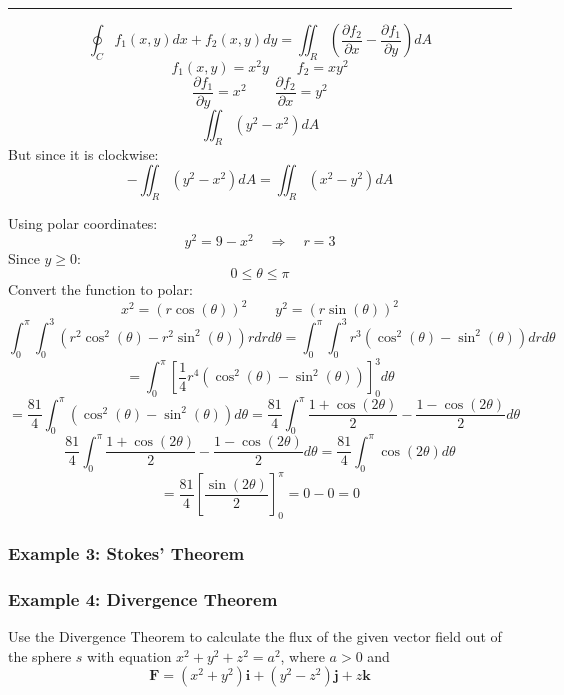 \rule{\textwidth}{1pt}

$$\oint_{ C } f_1(x, y) d x+f_2(x, y) d y=\iint_{ R }\left(\frac{\partial f_2}{\partial x}-\frac{\partial f_1}{\partial y}\right) d A$$
$$f_1(x,y)=x^2y\qquad f_2=xy^2$$
$$\frac{\partial f_1}{\partial y}=x^2 \qquad \frac{\partial f_2}{\partial x}=y^2$$
$$\iint_{ R }\left(y^2-x^2\right) d A$$
But since it is clockwise:
$$-\iint_{ R }\left(y^2-x^2\right) d A=\iint_{ R }\left(x^2-y^2\right) d A$$

Using polar coordinates:
$$y^2=9-x^2\quad\Rightarrow\quad r=3$$
Since $y\geq 0$:
$$0\leq\theta\leq\pi$$
Convert the function to polar:
$$x^2=(r\cos(\theta))^2\qquad y^2=(r\sin(\theta))^2$$
$$\int_0^\pi\int_0^3(r^2\cos^2(\theta)-r^2\sin^2(\theta))rdrd\theta =\int_0^\pi\int_0^3r^3(\cos^2(\theta)-\sin^2(\theta))drd\theta$$
$$=\int_0^\pi\left[\frac{1}{4}r^4(\cos^2(\theta)-\sin^2(\theta))\right]_0^3d\theta$$
$$=\frac{81}{4}\int_0^\pi(\cos^2(\theta)-\sin^2(\theta))d\theta=\frac{81}{4}\int_0^\pi\frac{1+\cos(2\theta)}{2}-\frac{1-\cos(2\theta)}{2} d\theta$$
$$\frac{81}{4}\int_0^\pi\frac{1+\cos(2\theta)}{2}-\frac{1-\cos(2\theta)}{2} d\theta=\frac{81}{4}\int_0^\pi \cos(2\theta) d\theta$$
$$=\frac{81}{4}\left[\frac{\sin(2\theta)}{2}\right]_0^\pi=0-0=0$$


\subsubsection{Example 3: Stokes' Theorem}
\subsubsection{Example 4: Divergence Theorem}
Use the Divergence Theorem to calculate the flux of the given vector field out
of the sphere $s$ with equation $x^2 + y^2 + z^2 = a^2$, where $a > 0$ and
$$\mathbf{F}=(x^{2}+y^{2})\mathbf{i}+(y^{2}-z^{2})\mathbf{j}+z\mathbf{k}$$
